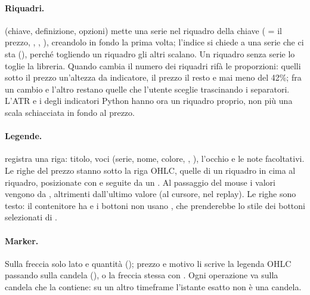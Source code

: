 \paragraph{Riquadri.} (chiave, definizione, opzioni) mette
una serie nel riquadro della chiave ( = il prezzo,
, , ), creandolo in
fondo la prima volta; l'indice si chiede a una serie che ci sta
(), perché togliendo un riquadro gli altri
scalano. Un riquadro senza serie lo toglie la libreria. Quando cambia il
numero dei riquadri  rifà le proporzioni: quelli sotto
il prezzo un'altezza da indicatore, il prezzo il resto e mai meno del 42\%;
fra un cambio e l'altro restano quelle che l'utente sceglie trascinando i
separatori. L'ATR e i  degli indicatori Python hanno ora
un riquadro proprio, non più una scala schiacciata in fondo al prezzo.

\paragraph{Legende.}  registra una riga:
titolo, voci (serie, nome, colore, , ), l'occhio e
le note facoltativi. Le righe del prezzo stanno sotto la riga OHLC, quelle di
un riquadro in cima al riquadro, posizionate con  e
seguite da un . Al passaggio del mouse i valori vengono da
, altrimenti dall'ultimo valore (al cursore, nel
replay). Le righe sono testo: il contenitore ha  e
i bottoni non usano , che prenderebbe lo stile dei bottoni
selezionati di .

\paragraph{Marker.} Sulla freccia solo lato e quantità (); prezzo e
motivo li scrive la legenda OHLC passando sulla candela
(), o la freccia stessa con . Ogni operazione va sulla candela che la contiene: su un altro
timeframe l'istante esatto non è una candela.

